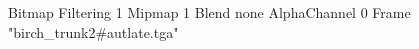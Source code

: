 {Bitmap
	{Filtering 1}
	{Mipmap 1}
	{Blend none}
	{AlphaChannel 0}
	{Frame "birch_trunk2#autlate.tga"}
}
